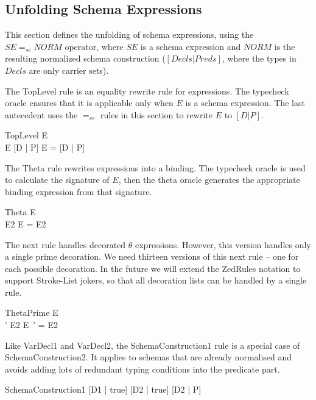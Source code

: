 \documentclass{entcs}
\newcommand{\sexprUnfoldsTo}{\mathrel{=_{se}}}
\newcommand{\declListUnfoldsTo}{\mathrel{=_d}}
\begin{document}
\subsection{Unfolding Schema Expressions}

This section defines the unfolding of schema expressions,
using the $SE \sexprUnfoldsTo NORM$ operator, where $SE$
is a schema expression and $NORM$ is the resulting normalized
schema construction ($[Decls|Preds]$, where the types in $Decls$
are only carrier sets).

The TopLevel rule is an equality rewrite rule for expressions.  The
typecheck oracle ensures that it is applicable only when $E$ is a schema
expression.  The last antecedent uses the $\sexprUnfoldsTo$ rules in
this section to rewrite $E$ to $[D | P]$.

\begin{zedrule}{TopLevel}
  E \hasType \power [D2 | true] \\
  E  \sexprUnfoldsTo [D | P]
\derives
  E = [D | P]
\end{zedrule}

The Theta rule rewrites expressions into a binding.  The typecheck
oracle is used to calculate the signature of $E$, then the theta
oracle generates the appropriate binding expression from that
signature.
\begin{zedrule}{Theta}
  E \hasType \power [D | true] \\
  \theta [D | true] \is E2
\derives
  \theta E = E2
\end{zedrule}


The next rule handles decorated $\theta$ expressions.  However, this
version handles only a single prime decoration.  We need thirteen
versions of this next rule -- one for 
each possible decoration.   In the future we will extend the ZedRules
notation to support Stroke-List jokers, so that all decoration lists can
be handled by a single rule.

\begin{zedrule}{ThetaPrime}
  E \hasType \power [D | true] \\
  \theta [D | true] ' \is E2
\derives
  \theta E~' = E2
\end{zedrule}

Like VarDecl1 and VarDecl2, the SchemaConstruction1 rule is a special
case of SchemaConstruction2.  It applies to schemas that are already
normalised and avoids adding lots of redundant typing conditions into
the predicate part.
\begin{zedrule}{SchemaConstruction1}
  [D1 | true] \declListUnfoldsTo [D2 | true]
\derives
  [D1 | P] \sexprUnfoldsTo [D2 | P]
\end{zedrule}
\end{document}
